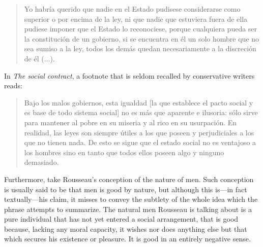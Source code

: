 \documentclass[a4paper]{article}
\begin{document}
\begin{quote}
    Yo habría querido que nadie en el Estado pudisese considerarse como superior
    o por encima de la ley, ni que nadie que estuviera fuera de ella pudiese
    imponer que el Estado lo reconociese, porque cualquiera pueda ser la
    constitución de un gobierno, si se encuentra en él un solo hombre que no sea
    sumiso a la ley, todos los demás quedan necesariamente a la discreción de él
    ($\ldots$).
\end{quote}

In \textit{The social contract}, a footnote that is seldom recalled by
conservative writers reads:

\begin{quote}
    Bajo los malos gobiernos, esta igualdad [la que establece el pacto social y
    es base de todo sistema social] no es más que aparente e ilusoria: sólo
    sirve para mantener al pobre en su miseria y al rico en su usurpación. En
    realidad, las leyes son siempre útiles a los que poseen y perjudiciales a
    los que no tienen nada. De esto se sigue que el estado social no es
    ventajoso a los hombres sino en tanto que todos ellos poseen algo y ninguno
    demasiado.
\end{quote}

Furthermore, take Rousseau's conception of the nature of men. Such conception is
usually said to be that men is good by nature, but although this is---in fact
textually---his claim, it misses to convey the subtlety of the whole idea which
the phrase attempts to summarize. The natural men Rousseau is talking about is a
pure individual that has not yet entered a social arrangement, that is good
because, lacking any moral capacity, it wishes nor does anything else but that
which secures his existence or pleasure. It is good in an entirely negative sense.






    
\end{document}

